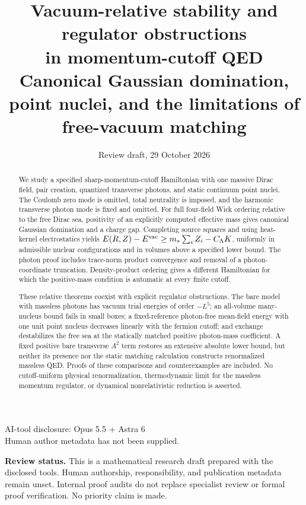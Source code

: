 \documentclass[11pt,letterpaper]{article}
\title{\textbf{Vacuum-relative stability and regulator obstructions\\
in momentum-cutoff QED}\\[0.5em]
\large Canonical Gaussian domination, point nuclei, and the limitations of free-vacuum matching}
\author{}
\date{Review draft, 29 October 2026}
\numberwithin{equation}{section}
\theoremstyle{remark}
\begin{document}
\maketitle
\begin{center}
\small AI-tool disclosure: Opus 5.5 + Astra 6\\
Human author metadata has not been supplied.
\end{center}
\begin{abstract}
We study a specified sharp-momentum-cutoff Hamiltonian with one massive
Dirac field, pair creation, quantized transverse photons, and static
continuum point nuclei. The Coulomb zero mode is omitted, total
neutrality is imposed, and the harmonic transverse photon mode is
fixed and omitted. For full four-field Wick ordering relative to the
free Dirac sea, positivity of an explicitly computed effective mass
gives canonical Gaussian domination and a charge gap. Completing
source squares and using heat-kernel electrostatics yields
$E(R,Z)-E^{\rm vac}\ge m_*\sum_iZ_i-C_\Lambda K$, uniformly in
admissible nuclear configurations and in volumes above a specified
lower bound. The photon proof includes trace-norm product convergence
and removal of a photon-coordinate truncation. Density-product
ordering gives a different Hamiltonian for which the positive-mass
condition is automatic at every finite cutoff.

These relative theorems coexist with explicit regulator obstructions.
The bare model with massless photons has vacuum trial energies of order $-L^5$;
an all-volume many-nucleus bound fails in small boxes; a fixed-reference
photon-free mean-field energy with one unit point nucleus decreases
linearly with the fermion cutoff; and exchange destabilizes the free
sea at the statically matched positive photon-mass coefficient.
A fixed positive bare transverse $A^2$ term restores an extensive
absolute lower bound, but neither its presence nor the static matching
calculation constructs renormalized massless QED. Proofs of these comparisons and counterexamples are included. No cutoff-uniform physical
renormalization, thermodynamic limit for the massless momentum
regulator, or dynamical nonrelativistic reduction is asserted.
\end{abstract}
\noindent\textbf{Review status.}
This is a mathematical research draft prepared with the disclosed tools.
Human authorship, responsibility, and publication metadata remain unset.
Internal proof audits do not replace specialist review or formal proof
verification. No priority claim is made.
\clearpage
\tableofcontents
\clearpage











\appendix


\end{document}
